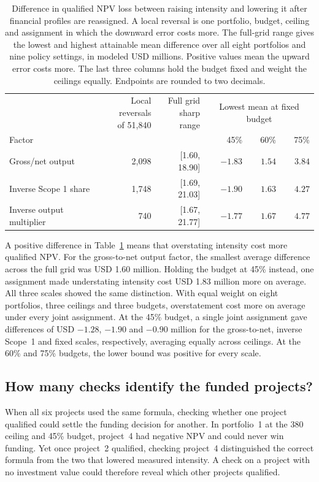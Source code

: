 \documentclass[ijfs,article,submit,oneauthor]{Definitions/mdpi}
\begin{document}
\begin{table}[!htb]\centering
\caption{Difference in qualified NPV loss between raising intensity and lowering it after financial profiles are reassigned. A local reversal is one portfolio, budget, ceiling and assignment in which the downward error costs more. The full-grid range gives the lowest and highest attainable mean difference over all eight portfolios and nine policy settings, in modeled USD millions. Positive values mean the upward error costs more. The last three columns hold the budget fixed and weight the ceilings equally. Endpoints are rounded to two decimals.}\label{tab:assignment}
\small\setlength{\tabcolsep}{4pt}
\begin{tabularx}{\linewidth}{@{}Xrrrrr@{}}\toprule
 &\shortstack[r]{Local reversals\\of 51,840} & \shortstack[r]{Full grid\\sharp range} &\multicolumn{3}{c}{Lowest mean at fixed budget}\\
\cmidrule(l){4-6}
Factor & & & 45\% & 60\% & 75\%\\\midrule
Gross/net output & 2,098 & [1.60, 18.90] & $-1.83$ & $1.54$ & $3.84$\\
Inverse Scope 1 share & 1,748 & [1.69, 21.03] & $-1.90$ & $1.63$ & $4.27$\\
Inverse output multiplier & 740 & [1.67, 21.77] & $-1.77$ & $1.67$ & $4.77$\\\bottomrule
\end{tabularx}
\end{table}

A positive difference in Table~\ref{tab:assignment} means that overstating intensity cost more qualified NPV. For the gross-to-net output factor, the smallest average difference across the full grid was USD 1.60 million. Holding the budget at 45\% instead, one assignment made understating intensity cost USD 1.83 million more on average. All three scales showed the same distinction. With equal weight on eight portfolios, three ceilings and three budgets, overstatement cost more on average under every joint assignment. At the 45\% budget, a single joint assignment gave differences of USD $-1.28$, $-1.90$ and $-0.90$ million for the gross-to-net, inverse Scope~1 and fixed scales, respectively, averaging equally across ceilings. At the 60\% and 75\% budgets, the lower bound was positive for every scale.

\subsection{How many checks identify the funded projects?}
When all six projects used the same formula, checking whether one project qualified could settle the funding decision for another. In portfolio~1 at the 380 ceiling and 45\% budget, project~4 had negative NPV and could never win funding. Yet once project~2 qualified, checking project~4 distinguished the correct formula from the two that lowered measured intensity. A check on a project with no investment value could therefore reveal which other projects qualified.
\end{document}
